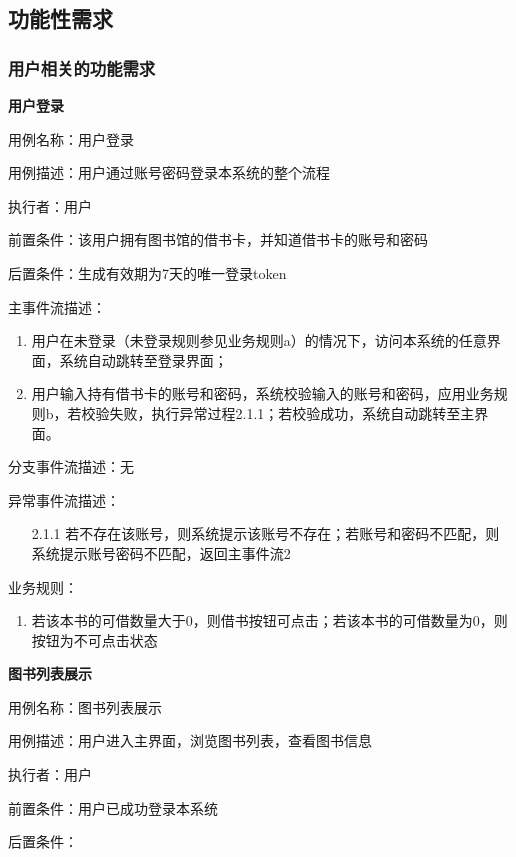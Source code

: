 \subsection{功能性需求}
\subsubsection{用户相关的功能需求}
\textbf{用户登录}

用例名称：用户登录

用例描述：用户通过账号密码登录本系统的整个流程

执行者：用户

前置条件：该用户拥有图书馆的借书卡，并知道借书卡的账号和密码

后置条件：生成有效期为7天的唯一登录token

主事件流描述：
    \begin{enumerate}
    \item 用户在未登录（未登录规则参见业务规则a）的情况下，访问本系统的任意界面，系统自动跳转至登录界面；
    \item 用户输入持有借书卡的账号和密码，系统校验输入的账号和密码，应用业务规则b，若校验失败，执行异常过程2.1.1；若校验成功，系统自动跳转至主界面。
    \end{enumerate}

分支事件流描述：无

异常事件流描述：
    \begin{itemize}
        \item[2.1.1] 若不存在该账号，则系统提示该账号不存在；若账号和密码不匹配，则系统提示账号密码不匹配，返回主事件流2
    \end{itemize}
 
 业务规则：
    \begin{enumerate}[label=\alph*]
        \item  若该本书的可借数量大于0，则借书按钮可点击；若该本书的可借数量为0，则按钮为不可点击状态     
    \end{enumerate}                                                                                                                                 


\textbf{图书列表展示}

    用例名称：图书列表展示

    用例描述：用户进入主界面，浏览图书列表，查看图书信息

    执行者：用户

    前置条件：用户已成功登录本系统

    后置条件：~ 

